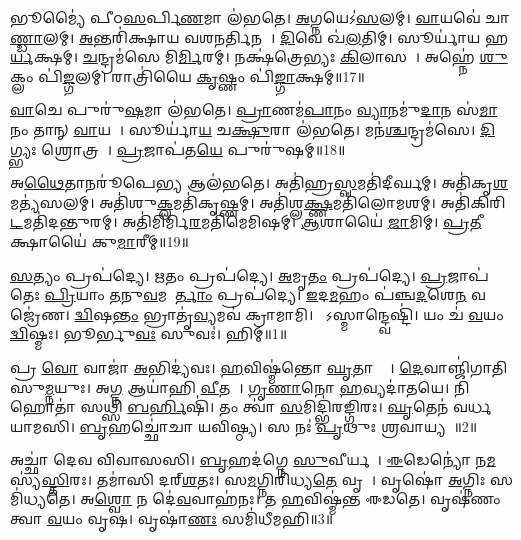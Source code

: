 𑌭𑍂𑌮𑍍𑌯𑍈॑ 𑌪𑍀𑌠\ul{𑌸}𑌰𑍍𑌪𑌿\ul{𑌣}𑌮𑌾 𑌲॑𑌭𑌤𑍇।
\ul{𑌅}𑌗𑍍𑌨𑌯𑍇\-𑌽॑\ul{𑌸}𑌲𑌮𑍍।
\ul{𑌵𑌾}𑌯𑌵𑍇॑ 𑌚𑌾\ul{𑌣𑍍𑌡𑌾}𑌲𑌮𑍍।
\ul{𑌅}𑌨𑍍𑌤𑌰𑌿॑𑌕𑍍𑌷𑌾𑌯 𑌵𑌶\ul{𑌨}𑌰𑍍𑌤𑌿𑌨𑌮𑍍᳚।
\ul{𑌦𑌿}𑌵𑍇 𑌖॑\ul{𑌲}𑌤𑌿𑌮𑍍।
𑌸𑍂𑌰𑍍𑌯𑌾॑𑌯 𑌹\ul{𑌰𑍍𑌯}𑌕𑍍𑌷𑌮𑍍।
\ul{𑌚}𑌨𑍍𑌦𑍍𑌰𑌮॑𑌸𑍇 𑌮𑌿\ul{𑌰𑍍𑌮𑌿}𑌰𑌮𑍍।
𑌨𑌕𑍍𑌷॑𑌤𑍍𑌰𑍇𑌭𑍍𑌯𑌃 \ul{𑌕𑌿}𑌲𑌾𑌸𑌮𑍍᳚।
𑌅𑌹𑍍𑌨𑍇॑ \ul{𑌶𑍁}𑌕𑍍𑌲𑌂 𑌪𑌿॑\ul{𑌙𑍍𑌗}𑌲𑌮𑍍।
𑌰𑌾𑌤𑍍𑌰𑌿॑𑌯𑍈 \ul{𑌕𑍃}𑌷𑍍𑌣𑌂 𑌪𑌿॑\ul{𑌙𑍍𑌗𑌾}𑌕𑍍𑌷𑌮𑍍॥17॥

\ul{𑌵𑌾}𑌚𑍇 𑌪𑍁𑌰𑍁॑\ul{𑌷}𑌮𑌾 𑌲॑𑌭𑌤𑍇।
\ul{𑌪𑍍𑌰𑌾}𑌣𑌮॑\ul{𑌪𑌾}𑌨𑌂 \ul{𑌵𑍍𑌯𑌾}𑌨𑌮𑍁॑\ul{𑌦𑌾}𑌨 𑌸॑\ul{𑌮𑌾}𑌨𑌂 𑌤𑌾𑌨𑍍 \ul{𑌵𑌾}𑌯𑌵𑍇᳚।
𑌸𑍂𑌰𑍍𑌯𑌾॑\ul{𑌯} 𑌚\ul{𑌕𑍍𑌷𑍁}𑌰𑌾 𑌲॑𑌭𑌤𑍇।
𑌮𑌨॑\ul{𑌶𑍍𑌚}𑌨𑍍𑌦𑍍𑌰𑌮॑𑌸𑍇।
\ul{𑌦𑌿}𑌗𑍍𑌭𑍍𑌯𑌃 𑌶𑍍𑌰𑍋𑌤𑍍𑌰𑌮𑍍᳚।
\ul{𑌪𑍍𑌰}𑌜𑌾𑌪॑𑌤\ul{𑌯𑍇} 𑌪𑍁𑌰𑍁॑𑌷𑌮𑍍॥18॥

𑌅\ul{𑌥𑍈}𑌤𑌾𑌨𑌰𑍂॑𑌪𑍇\ul{𑌭𑍍𑌯} 𑌆𑌲॑𑌭𑌤𑍇।
𑌅𑌤𑌿॑𑌹𑍍𑌰\ul{𑌸𑍍𑌵}𑌮𑌤𑌿॑𑌦𑍀𑌰𑍍𑌘𑌮𑍍।
𑌅𑌤𑌿॑𑌕𑍃\ul{𑌶}𑌮𑌤𑍍𑌯॑𑌸𑌲𑌮𑍍।
𑌅𑌤𑌿॑𑌶𑍁\ul{𑌕𑍍𑌲}𑌮𑌤𑌿॑𑌕𑍃𑌷𑍍𑌣𑌮𑍍।
𑌅𑌤𑌿॑𑌶𑍍𑌲\ul{𑌕𑍍𑌷𑍍𑌣}\-𑌮𑌤𑌿॑𑌲𑍋𑌮𑌶𑌮𑍍।
𑌅𑌤𑌿॑𑌕𑌿𑌰𑌿\ul{𑌟}𑌮𑌤𑌿॑𑌦𑌨𑍍𑌤𑍁𑌰𑌮𑍍।
𑌅𑌤𑌿॑𑌮𑌿𑌰𑍍𑌮𑌿\ul{𑌰}𑌮𑌤𑌿॑\-𑌮𑍇𑌮𑌿𑌷𑌮𑍍।
\ul{𑌆}𑌶𑌾𑌯𑍈॑ \ul{𑌜𑌾}𑌮𑌿𑌮𑍍।
\ul{𑌪𑍍𑌰}\ul{𑌤𑍀}𑌕𑍍𑌷𑌾𑌯𑍈॑ 𑌕𑍁\ul{𑌮𑌾}𑌰𑍀𑌮𑍍॥19॥%




\clearpage
{}
\setcounter{anuvakam}{0}

\ul{𑌸}𑌤𑍍𑌯𑌂 𑌪𑍍𑌰𑌪॑𑌦𑍍𑌯𑍇।
\ul{𑌋}𑌤𑌂 𑌪𑍍𑌰𑌪॑𑌦𑍍𑌯𑍇।
\ul{𑌅}𑌮𑍃\ul{𑌤𑌂} 𑌪𑍍𑌰𑌪॑𑌦𑍍𑌯𑍇।
\ul{𑌪𑍍𑌰}𑌜𑌾𑌪॑𑌤𑍇𑌃 \ul{𑌪𑍍𑌰𑌿}𑌯𑌾𑌂 \ul{𑌤}𑌨𑍁\ul{𑌵}𑌮𑌨𑌾᳚\ul{𑌰𑍍𑌤𑌾𑌂} 𑌪𑍍𑌰𑌪॑𑌦𑍍𑌯𑍇।
\ul{𑌇}𑌦\ul{𑌮}𑌹𑌂 𑌪॑𑌞𑍍𑌚\ul{𑌦}𑌶𑍇\ul{𑌨} 𑌵𑌜𑍍𑌰𑍇॑𑌣।
\ul{𑌦𑍍𑌵𑌿}𑌷\ul{𑌨𑍍𑌤𑌂} 𑌭𑍍𑌰𑌾𑌤𑍃॑\ul{𑌵𑍍𑌯}𑌮𑌵॑ 𑌕𑍍𑌰𑌾𑌮𑌾𑌮𑌿।
𑌯𑍋᳚𑌽𑌸𑍍𑌮𑌾𑌨𑍍𑌦𑍍𑌵𑍇𑌷𑍍𑌟𑌿॑।
𑌯𑌂 𑌚॑ \ul{𑌵}𑌯𑌂 \ul{𑌦𑍍𑌵𑌿}𑌷𑍍𑌮𑌃।
𑌭𑍂𑌰𑍍𑌭𑍁\ul{𑌵𑌃} 𑌸𑍁𑌵𑌃॑।
𑌹𑌿𑌮𑍍॥1॥\anuvakamend[\ul{𑌸}𑌤𑍍𑌯𑌂 𑌦𑌶॑]

𑌪𑍍𑌰 \ul{𑌵𑍋} 𑌵𑌾𑌜𑌾॑ \ul{𑌅}𑌭𑌿𑌦𑍍𑌯॑𑌵𑌃।
\ul{𑌹}𑌵𑌿𑌷𑍍𑌮॑𑌨𑍍𑌤𑍋 \ul{𑌘𑍃}𑌤𑌾𑌚𑍍𑌯𑌾᳚।
\ul{𑌦𑍇}𑌵𑌾𑌞𑍍𑌜𑌿॑𑌗𑌾𑌤𑌿 𑌸𑍁\ul{𑌮𑍍𑌨}𑌯𑍁𑌃।
𑌅\ul{𑌗𑍍𑌨} 𑌆𑌯𑌾॑𑌹𑌿 \ul{𑌵𑍀}𑌤𑌯𑍇᳚।
\ul{𑌗𑍃}\ul{𑌣𑌾}𑌨𑍋 \ul{𑌹}𑌵𑍍𑌯𑌦𑌾॑𑌤𑌯𑍇।
𑌨𑌿 𑌹𑍋𑌤𑌾॑ 𑌸𑌥𑍍𑌸𑌿 \ul{𑌬}\ul{𑌰𑍍}𑌹𑌿𑌷𑌿॑।
𑌤𑌂 𑌤𑍍𑌵𑌾॑ \ul{𑌸}𑌮𑌿𑌦𑍍𑌭𑌿॑𑌰𑌙𑍍𑌗𑌿𑌰𑌃।
\ul{𑌘𑍃}𑌤𑍇𑌨॑ 𑌵𑌰𑍍𑌧𑌯𑌾𑌮𑌸𑌿।
\ul{𑌬𑍃}𑌹𑌚𑍍𑌛𑍋॑𑌚𑌾 𑌯𑌵𑌿𑌷𑍍𑌠𑍍𑌯।
𑌸 𑌨𑌃॑ \ul{𑌪𑍃}𑌥𑍁𑌃 \ul{𑌶𑍍𑌰}𑌵𑌾𑌯𑍍𑌯𑌮𑍍᳚॥2॥

𑌅𑌚𑍍𑌛𑌾॑ 𑌦𑍇𑌵 𑌵𑌿𑌵𑌾𑌸𑌸𑌿।
\ul{𑌬𑍃}𑌹𑌦॑𑌗𑍍𑌨𑍇 \ul{𑌸𑍁}𑌵𑍀𑌰𑍍𑌯𑌮𑍍᳚।
\ul{𑌈}𑌡𑍇𑌨𑍍𑌯𑍋॑ 𑌨\ul{𑌮}𑌸𑍍𑌯॑\ul{𑌸𑍍𑌤𑌿}𑌰𑌃।
𑌤𑌮𑌾॑𑌸𑌿 𑌦𑌰𑍍‌\mbox{}\ul{𑌶}𑌤𑌃।
𑌸\ul{𑌮}𑌗𑍍𑌨𑌿𑌰𑌿॑𑌧𑍍𑌯\ul{𑌤𑍇} 𑌵𑍃𑌷𑌾᳚।
𑌵𑍃𑌷𑍋॑ \ul{𑌅}𑌗𑍍𑌨𑌿𑌃 𑌸𑌮𑌿॑𑌧𑍍𑌯𑌤𑍇।
𑌅\ul{𑌶𑍍𑌵𑍋} 𑌨 𑌦𑍇॑\ul{𑌵}𑌵𑌾𑌹॑𑌨𑌃।
𑌤 \ul{𑌹}𑌵𑌿𑌷𑍍𑌮॑𑌨𑍍𑌤 𑌈𑌡𑌤𑍇।
𑌵𑍃𑌷॑𑌣𑌂 𑌤𑍍𑌵𑌾 \ul{𑌵}𑌯𑌂 𑌵𑍃𑌷\sn{}।
𑌵𑍃𑌷𑌾॑\ul{𑌣𑌃} 𑌸𑌮𑌿॑𑌧𑍀𑌮𑌹𑌿॥3॥

